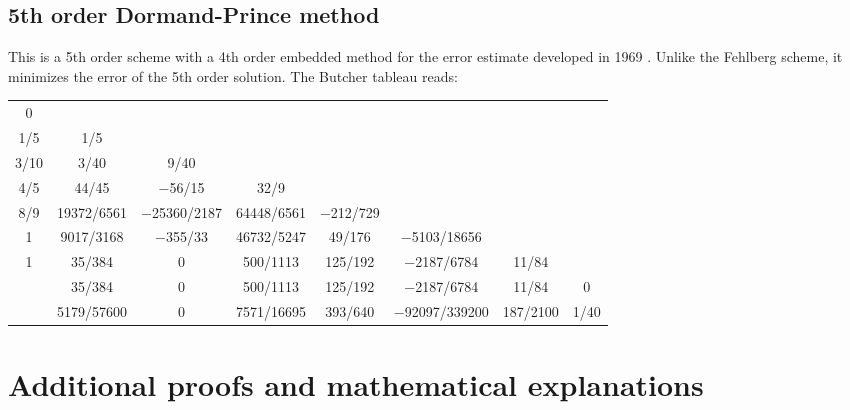 \section{5th order Dormand-Prince method}
This is a 5th order scheme with a 4th order embedded method for the error estimate developed in 1969 \cite{RK-DormandPrince}. Unlike the Fehlberg scheme, it minimizes the error of the 5th order solution. The Butcher tableau reads:

\begin{center}
	\begin{tabular}{c | c c c c c c c}
		0 & & & & & & & \\
		1/5 & 1/5 & & & & & & \\
		3/10 & 3/40 & 9/40 & & & & & \\
		4/5 & 44/45 & −56/15 & 32/9 & & & & \\
		8/9 & 19372/6561 & −25360/2187 & 64448/6561 & −212/729 & & & \\
		1 & 9017/3168 & −355/33 & 46732/5247 & 49/176 & −5103/18656 & & \\
		1 & 35/384 & 0 & 500/1113 & 125/192 & −2187/6784 & 11/84 & \\ \hline	
		& 35/384 & 0 & 500/1113 & 125/192 & −2187/6784 & 11/84 & 0 \\
		& 5179/57600 & 0 & 7571/16695 & 393/640 & −92097/339200 & 187/2100 & 1/40 
	\end{tabular}
\end{center}

\chapter{Additional proofs and mathematical explanations}

